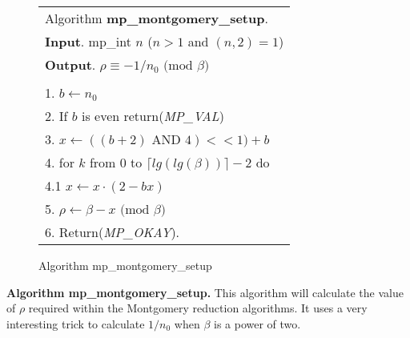 \documentclass[b5paper]{book}
\begin{document}
\begin{figure}[!here]
\begin{small}
\begin{center}
\begin{tabular}{l}
\hline Algorithm \textbf{mp\_montgomery\_setup}. \\
\textbf{Input}.   mp\_int $n$ ($n > 1$ and $(n, 2) = 1$) \\
\textbf{Output}.  $\rho \equiv -1/n_0 \mbox{ (mod }\beta\mbox{)}$ \\
\hline \\
1.  $b \leftarrow n_0$ \\
2.  If $b$ is even return(\textit{MP\_VAL}) \\
3.  $x \leftarrow ((b + 2) \mbox{ AND } 4) << 1) + b$ \\
4.  for $k$ from 0 to $\lceil lg(lg(\beta)) \rceil - 2$ do \\
\hspace{3mm}4.1  $x \leftarrow x \cdot (2 - bx)$ \\
5.  $\rho \leftarrow \beta - x \mbox{ (mod }\beta\mbox{)}$ \\
6.  Return(\textit{MP\_OKAY}). \\
\hline
\end{tabular}
\end{center}
\end{small}
\caption{Algorithm mp\_montgomery\_setup} 
\end{figure}

\textbf{Algorithm mp\_montgomery\_setup.}
This algorithm will calculate the value of $\rho$ required within the Montgomery reduction algorithms.  It uses a very interesting trick 
to calculate $1/n_0$ when $\beta$ is a power of two.  
\end{document}
